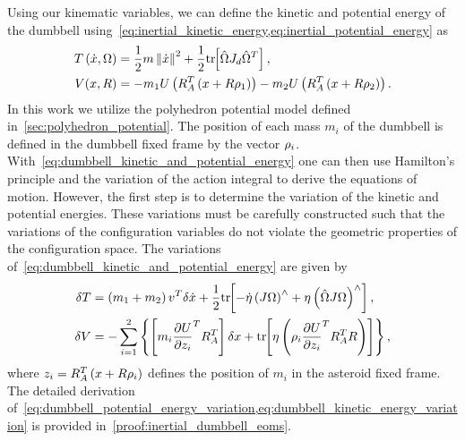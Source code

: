 Using our kinematic variables, we can define the kinetic and potential energy of the dumbbell using~\cref{eq:inertial_kinetic_energy,eq:inertial_potential_energy} as
\begin{subequations}\label{eq:dumbbell_kinetic_and_potential_energy}
\begin{align}
    T\left( \dot{x}, \Omega \right) &= \frac{1}{2} m \left\| \dot{x} \right\|^2 + \frac{1}{2} \mathrm{tr}\negthickspace\left[ \hat{\Omega} J_d \hat{\Omega}^T \right] , \label{eq:dumbbell_kinetic_energy}\\
    V( x, R ) &=  - m_1 U \left( R_A^T \left( x + R \rho_1 \right) \right) - m_2 U \left( R_A^T \left( x + R \rho_2 \right) \right). \label{eq:dumbbell_potential_energy}
\end{align}
\end{subequations}     
In this work we utilize the polyhedron potential model defined in~\cref{sec:polyhedron_potential}.
The position of each mass \(m_i\) of the dumbbell is defined in the dumbbell fixed frame by the vector \(\rho_i\). 
With~\cref{eq:dumbbell_kinetic_and_potential_energy} one can then use Hamilton's principle  and the variation of the action integral to derive the equations of motion.
However, the first step is to determine the variation of the kinetic and potential energies.
These variations must be carefully constructed such that the variations of the configuration variables do not violate the geometric properties of the configuration space.
The variations of~\cref{eq:dumbbell_kinetic_and_potential_energy} are given by
\begin{align} 
    \delta T &= \left( m_1 + m_2 \right) v^T \delta \dot{x} + \frac{1}{2} \mathrm{tr}\negthickspace\left[ - \dot{\eta} \left( J \Omega \right)^\wedge + \eta \left( \hat{\Omega} J \Omega \right)^\wedge  \right], \label{eq:dumbbell_kinetic_energy_variation} \\
    \delta V &= - \sum_{i=1}^2 \left\{  \left[ m_i \frac{\partial U}{\partial z_i}^T R_A^T  \right] \delta x +  \mathrm{tr}\negthickspace\left[ \eta \left( \rho_i \frac{\partial U}{\partial z_i}^T R_A^T R  \right)  \right] \right\},\label{eq:dumbbell_potential_energy_variation}
\end{align}
where \( z_i = R_A^T \left( x + R \rho_i \right) \) defines the position of \( m_i \) in the asteroid fixed frame.
The detailed derivation of~\cref{eq:dumbbell_potential_energy_variation,eq:dumbbell_kinetic_energy_variation} is provided in~\cref{proof:inertial_dumbbell_eoms}.

